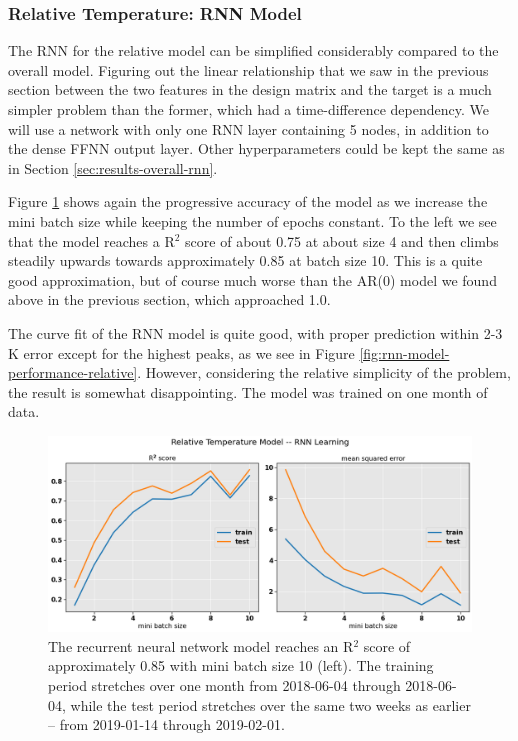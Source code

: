 \documentclass[]{article}
\begin{document}
\subsubsection{Relative Temperature: RNN Model} \label{sec:results-relative-rnn}
The RNN for the relative model can be simplified considerably compared to the overall model. Figuring out the linear relationship that we saw in the previous section between the two features in the design matrix and the target is a much simpler problem than the former, which had a time-difference dependency. We will use a network with only one RNN layer containing 5 nodes, in addition to the dense FFNN output layer. Other hyperparameters could be kept the same as in Section \ref{sec:results-overall-rnn}. 

Figure \ref{fig:rnn-model-learning-relative} shows again the progressive accuracy of the model as we increase the mini batch size while keeping the number of epochs constant. To the left we see that the model reaches a R$^2$ score of about 0.75 at about size 4 and then climbs steadily upwards towards approximately 0.85 at batch size 10. This is a quite good approximation, but of course much worse than the AR($0$) model we found above in the previous section, which approached 1.0. 

The curve fit of the RNN model is quite good, with proper prediction within 2-3 K error except for the highest peaks, as we see in Figure \ref{fig:rnn-model-performance-relative}. However, considering the relative simplicity of the problem, the result is somewhat disappointing. The model was trained on one month of data.

\begin{figure}[!h]
	\centering
	\includegraphics[width=1\linewidth]{./figs/rnn-model-learning-relative.png}
	\caption{The recurrent neural network model reaches an R$^2$ score of approximately 0.85 with mini batch size 10 (left). The training period stretches over one month from 2018-06-04 through 2018-06-04, while the test period stretches over the same two weeks as earlier -- from 2019-01-14 through 2019-02-01.}
	\label{fig:rnn-model-learning-relative}
\end{figure}
\end{document}
